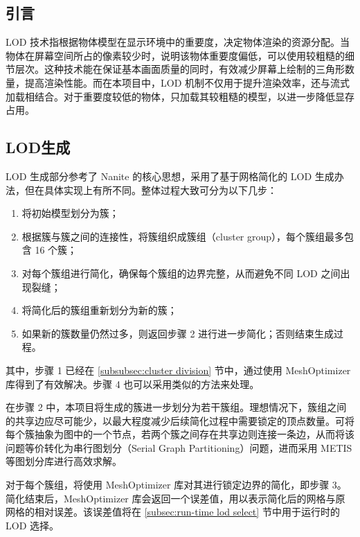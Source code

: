 \subsection{引言}

LOD 技术指根据物体模型在显示环境中的重要度，决定物体渲染的资源分配。当物体在屏幕空间所占的像素较少时，说明该物体重要度偏低，可以使用较粗糙的细节层次。这种技术能在保证基本画面质量的同时，有效减少屏幕上绘制的三角形数量，提高渲染性能\cite{Deng2017}。而在本项目中，LOD 机制不仅用于提升渲染效率，还与流式加载相结合。对于重要度较低的物体，只加载其较粗糙的模型，以进一步降低显存占用。

\subsection{LOD生成} \label{subsec:LOD generation}

LOD 生成部分参考了 Nanite 的核心思想，采用了基于网格简化的 LOD 生成办法\cite{Jensen2023}，但在具体实现上有所不同。整体过程大致可分为以下几步\cite{Xavier2024}：

\newcommand{\stepref}[1]{\textbf{Step~\ref{#1}}}

\begin{enumerate}
    \item 将初始模型划分为簇；
    \item 根据簇与簇之间的连接性，将簇组织成簇组（cluster group），每个簇组最多包含 16 个簇；
    \item 对每个簇组进行简化，确保每个簇组的边界完整，从而避免不同 LOD 之间出现裂缝；
    \item 将简化后的簇组重新划分为新的簇；
    \item 如果新的簇数量仍然过多，则返回步骤 2 进行进一步简化；否则结束生成过程。
\end{enumerate}

其中，步骤 1 已经在 \ref{subsubsec:cluster division} 节中，通过使用 MeshOptimizer 库得到了有效解决。步骤 4 也可以采用类似的方法来处理。

在步骤 2 中，本项目将生成的簇进一步划分为若干簇组。理想情况下，簇组之间的共享边应尽可能少，以最大程度减少后续简化过程中需要锁定的顶点数量。可将每个簇抽象为图中的一个节点，若两个簇之间存在共享边则连接一条边，从而将该问题等价转化为串行图划分（Serial Graph Partitioning）问题，进而采用 METIS 等图划分库进行高效求解\cite{METIS}。

对于每个簇组，将使用 MeshOptimizer 库对其进行锁定边界的简化，即步骤 3。简化结束后，MeshOptimizer 库会返回一个误差值，用以表示简化后的网格与原网格的相对误差。该误差值将在 \ref{subsec:run-time lod select} 节中用于运行时的 LOD 选择。

